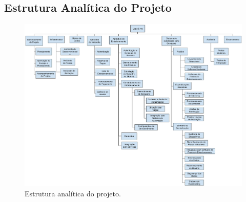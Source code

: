 
\begin{landscape}

\chapter{Estrutura Analítica do Projeto}\label{ch:wbs}

%

\begin{figure}[h]
	\includegraphics[height=.75\textwidth,angle=0]{images/wbs}
	\caption{Estrutura analítica do projeto.}
	\label{fig:wbs}
	\centering
\end{figure}

\end{landscape}
